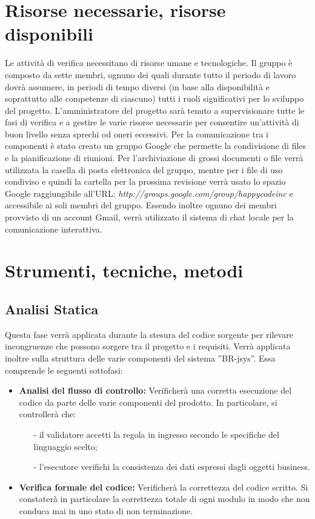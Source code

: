 \documentclass[11pt,titlepage,a4paper]{report}
\begin{document}
\section{Risorse necessarie, risorse disponibili}
Le attivit\`a di verifica necessitano di risorse umane e tecnologiche. Il gruppo \`e composto da sette membri, ognuno dei quali durante tutto il periodo di lavoro dovr\`a assumere, in periodi di tempo diversi (in base alla disponibilit\`a e soprattutto alle competenze di ciascuno) tutti i ruoli significativi per lo sviluppo del progetto. L'amministratore del progetto sar\`a tenuto a supervisionare tutte le fasi di verifica e a gestire le varie risorse necessarie per consentire un'attivit\`a di buon livello senza sprechi od oneri eccessivi. Per la comunicazione tra i componenti \`e stato creato un gruppo Google che permette la condivisione di files e la pianificazione di riunioni. Per l'archiviazione di grossi documenti o file verr\`a utilizzata la casella di posta elettronica del gruppo, mentre per i file di uso condiviso e quindi la cartella per la prossima revisione verr\`a usato lo spazio Google raggiungibile all'URL: \textit{http://groups.google.com/group/happycodeinc} e accessibile ai soli membri del gruppo.
Essendo inoltre ognuno dei membri provvisto di un account Gmail, verr\`a utilizzato il sistema di chat locale per la comunicazione interattiva.
\section{Strumenti, tecniche, metodi}
\subsection{Analisi Statica}
Questa fase verr\`a applicata durante la stesura del codice sorgente per rilevare incongruenze che possono sorgere tra il progetto e i requisiti. Verr\`a applicata inoltre sulla struttura delle varie componenti del sistema ''BR-jsys''. Essa comprende le seguenti sottofasi:
\begin{itemize}
\item \textbf{Analisi del flusso di controllo:} Verificher\`a una corretta esecuzione del codice  da parte delle varie componenti del prodotto.
In particolare, si controller\`a che:
\begin{itemize}
\item[-]il validatore accetti la regola in ingresso secondo le specifiche del linguaggio scelto;
\item[-]l'esecutore verifichi la consistenza dei dati espressi dagli oggetti business.
\end{itemize}
\item \textbf{Verifica formale del codice:} Verificher\`a la correttezza del codice scritto. Si constater\`a in particolare la correttezza totale di ogni modulo in modo che non conduca mai in uno stato di non terminazione.
\end{itemize}
\end{document}
